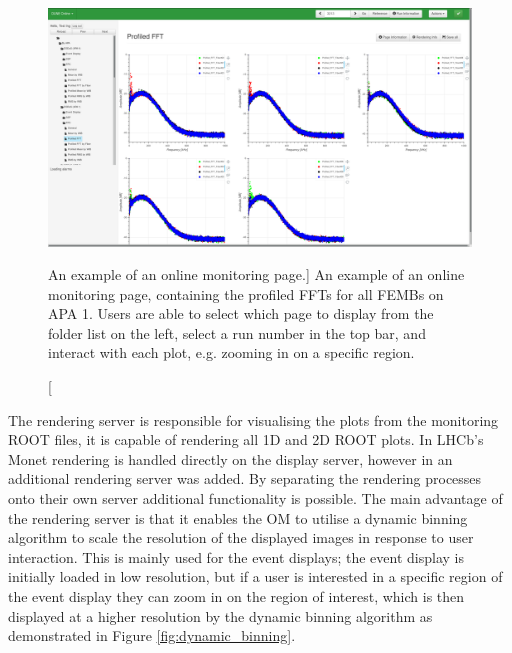 \begin{figure}

	\centering

	\includegraphics[width=\textwidth]{figures/profiled_fft_monet.png}

	\caption
	[An example of an online monitoring page.] 
	{ An example of an online monitoring page, containing the profiled FFTs for
	all FEMBs on APA 1. Users are able to select which page to display from the
	folder list on the left, select a run number in the top bar, and interact 
	with each plot, e.g. zooming in on a specific region.} 
	\label{fig:monet_page}

\end{figure}

The rendering server is responsible for visualising the plots from the 
monitoring ROOT files, it is capable of rendering all 1D and 2D ROOT plots. In 
LHCb's Monet rendering is handled directly on the display server, however in 
\protodune{} an additional rendering server was added. By separating the 
rendering processes onto their own server additional functionality is 
possible. The main advantage of the rendering server is that it enables the 
OM to utilise a dynamic binning algorithm to scale the resolution of the 
displayed images in response to user interaction. This is mainly used for the 
event displays; the event display is initially loaded in low resolution, but 
if a user is interested in a specific region of the event display they can 
zoom in on the region of interest, which is then displayed at a higher 
resolution by the dynamic binning algorithm as demonstrated in Figure 
\ref{fig:dynamic_binning}.


